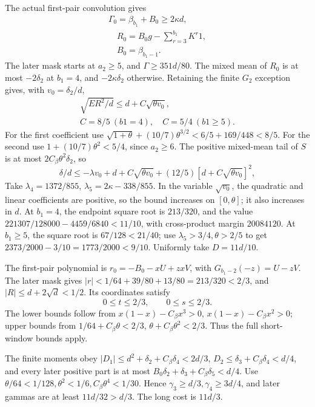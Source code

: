 The actual first-pair convolution gives
\[
\begin{gathered}
\Gamma_0=\beta_{b_1}+B_0\ge2\kappa d,\\
\quad R_0=B_0g-\sum_{r=3}^{b_1}K^r1,\\
\quad B_0=\beta_{b_1-1}.
\end{gathered}
\]
The later mask starts at \(a_2\ge5\), and \(\Gamma\ge351d/80\). The mixed mean of \(R_0\) is at most \(-2\delta_2\) at \(b_1=4\), and \(-2\kappa \delta_2\) otherwise. Retaining the finite \(G_2\) exception gives, with \(v_0=\delta_2/d\),
\[
\begin{gathered}
\sqrt{ER^2/d}\le d+C\sqrt{\theta v_0},\qquad\\
C=8/5\ (b1=4),\quad C=5/4\ (b1\ge5).
\end{gathered}\tag{C177.T184.24}
\]
For the first coefficient use \(\sqrt{1+\theta}+(10/7)\theta^{3/2}<6/5+169/448<8/5\). For the second use \(1+(10/7)\theta^2<5/4\), since \(a_2\ge6\). The positive mixed-mean tail of \(S\) is at most \(2C_\beta\theta^2\delta_2\), so
\[
\delta/d\le-\lambda v_0+d+C\sqrt{\theta v_0}
+(12/5)[d+C\sqrt{\theta v_0}]^2,
\]
Take \(\lambda_4=1372/855\), \(\lambda_5=2\kappa-338/855\). In the variable \(\sqrt{v_0}\), the quadratic and linear coefficients are positive, so the bound increases on \([0,\allowbreak \allowbreak  \theta]\); it also increases in \(d\). At \(b_1=4\), the endpoint square root is \(213/320\), and the value \(221307/128000-4459/6840<11/10\), with cross-product margin \(20084120\). At \(b_1\ge5\), the square root is \(67/128<21/40\); use \(\lambda_5>3/4,\allowbreak \allowbreak  \theta>2/5\) to get \(2373/2000-3/10=1773/2000<9/10\). Uniformly take \(D=11d/10\).

The first-pair polynomial is \(r_0=-B_0-xU+zxV\), with \(G_{b_1-2}(-z)=U-zV\). The later mask gives \(|r|<1/64+39/80+13/80=213/320<2/3\), and \(|R|\le d+2\sqrt d<1/2\). Its coordinates satisfy
\[
0\le t\le2/3,\qquad0\le s\le2/3.                     \tag{C177.T184.25}
\]
The lower bounds follow from \(x(1-x)-C_\beta x^3>0\), \(x(1-x)-C_\beta x^2>0\); upper bounds from \(1/64+C_\beta\theta<2/3\), \(\theta+C_\beta\theta^2<2/3\). Thus the full short-window bounds apply.

The finite moments obey \(|D_1|\le d^2+\delta_2+C_\beta \delta_4<2d/3\), \(D_2\le \delta_3+C_\beta \delta_4<d/4\), and every later positive part is at most \(B_0\delta_2+\delta_3+C_\beta \delta_5<d/4\). Use \(\theta/64<1/128,\allowbreak \allowbreak  \theta^2<1/6,\allowbreak \allowbreak  C_\beta\theta^4<1/30\). Hence \(\gamma_3\ge d/3,\allowbreak \allowbreak  \gamma_4\ge3d/4\), and later gammas are at least \(11d/32>d/3\). The long cost is \(11d/3\).

